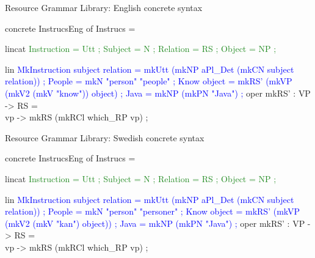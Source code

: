 \begin{frame}[fragile]{Resource Grammar Library: English concrete syntax} \pause
\begin{semiverbatim}
concrete InstrucsEng of Instrucs = {
  lincat\textcolor{ForestGreen}{
    Instruction = \textcolor{Type}{Utt} ;
    Subject = \textcolor{Type}{N} ;
    Relation = \textcolor{Type}{RS} ;
    Object = \textcolor{Type}{NP} ;}\pause

  lin \textcolor{Blue}{
   MkInstruction subject relation = 
            mkUtt (mkNP aPl_Det (mkCN subject relation)) ;
   People = mkN \textcolor{String}{"person" \textcolor{String}{"people"}} ;
   Know object = mkRS' (mkVP (mkV2 (mkV \textcolor{String}{"know"})) object) ;
   Java = mkNP (mkPN \textcolor{String}{\textcolor{String}{"Java"}}) ; }
  oper
     mkRS' : \textcolor{Type}{VP} -> \textcolor{Type}{RS} = \\vp -> mkRS (mkRCl which_RP vp) ;
}
\end{semiverbatim}
\end{frame}

\begin{frame}[fragile]{Resource Grammar Library: Swedish concrete syntax}
\begin{semiverbatim}
concrete InstrucsEng of Instrucs = {
  lincat\textcolor{ForestGreen}{
    Instruction = \textcolor{Type}{Utt} ;
    Subject = \textcolor{Type}{N} ;
    Relation = \textcolor{Type}{RS} ;
    Object = \textcolor{Type}{NP} ;}

  lin\textcolor{Blue}{
   MkInstruction subject relation = 
            mkUtt (mkNP aPl_Det (mkCN subject relation)) ;
   People = mkN \textcolor{String}{"person" "personer"} ;
   Know object = mkRS' (mkVP (mkV2 (mkV \textcolor{String}{"kan"}) object)) ;
   Java = mkNP (mkPN \textcolor{String}{\textcolor{String}{"Java"}}) ; }
  oper
     mkRS' : \textcolor{Type}{VP} -> \textcolor{Type}{RS} = \\vp -> mkRS (mkRCl which_RP vp) ;
}
\end{semiverbatim}
\end{frame}

\begin{frame}{}
\end{frame}

